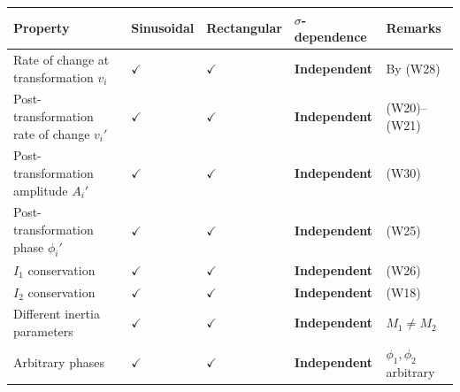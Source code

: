 \documentclass[a4paper,11pt]{article}
\newcounter{none}
\begin{document}
{\def\LTcaptype{none} %
\begin{longtable}[]{@{}
  >{\centering\arraybackslash}p{}
  >{\centering\arraybackslash}p{}
  >{\centering\arraybackslash}p{}
  >{\centering\arraybackslash}p{}
  >{\centering\arraybackslash}p{}@{}}
\toprule\noalign{}
\begin{minipage}[b]{\linewidth}\centering
Property
\end{minipage} & \begin{minipage}[b]{\linewidth}\centering
Sinusoidal
\end{minipage} & \begin{minipage}[b]{\linewidth}\centering
Rectangular
\end{minipage} & \begin{minipage}[b]{\linewidth}\centering
\(\sigma\)-dependence
\end{minipage} & \begin{minipage}[b]{\linewidth}\centering
Remarks
\end{minipage} \\
\midrule\noalign{}
\endhead
\bottomrule\noalign{}
\endlastfoot
Rate of change at transformation \(v_i\) & \(\checkmark\) &
\(\checkmark\) & \textbf{Independent} & By (W28) \\
Post-transformation rate of change \(v_i'\) & \(\checkmark\) &
\(\checkmark\) & \textbf{Independent} & (W20)--(W21) \\
Post-transformation amplitude \(A_i'\) & \(\checkmark\) & \(\checkmark\)
& \textbf{Independent} & (W30) \\
Post-transformation phase \(\phi_i'\) & \(\checkmark\) & \(\checkmark\)
& \textbf{Independent} & (W25) \\
\(I_1\) conservation & \(\checkmark\) & \(\checkmark\) &
\textbf{Independent} & (W26) \\
\(I_2\) conservation & \(\checkmark\) & \(\checkmark\) &
\textbf{Independent} & (W18) \\
Different inertia parameters & \(\checkmark\) & \(\checkmark\) &
\textbf{Independent} & \(M_1 \neq M_2\) \\
Arbitrary phases & \(\checkmark\) & \(\checkmark\) &
\textbf{Independent} & \(\phi_1, \phi_2\) arbitrary \\
\end{longtable}
}
\end{document}
